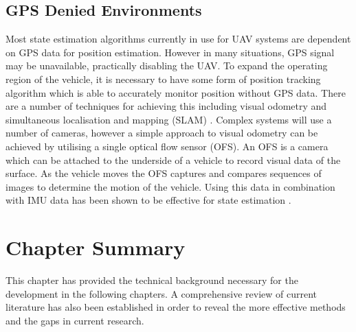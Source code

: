 \subsection{GPS Denied Environments}
Most state estimation algorithms currently in use for UAV systems are dependent on GPS data for position estimation. However in many situations, GPS signal may be unavailable, practically disabling the UAV. To expand the operating region of the vehicle, it is necessary to have some form of position tracking algorithm which is able to accurately monitor position without GPS data. There are a number of techniques for achieving this including visual odometry and simultaneous localisation and mapping (SLAM) \cite{Balamurugan2016}. Complex systems will use a number of cameras, however a simple approach to visual odometry can be achieved by utilising a single optical flow sensor (OFS). An OFS is a camera which can be attached to the underside of a vehicle to record visual data of the surface. As the vehicle moves the OFS captures and compares sequences of images to determine the motion of the vehicle. Using this data in combination with IMU data has been shown to be effective for state estimation \cite{Driessen2018}. 

\section{Chapter Summary}
This chapter has provided the technical background necessary for the development in the following chapters. A comprehensive review of current literature has also been established in order to reveal the more effective methods and the gaps in current research.



\clearpage


